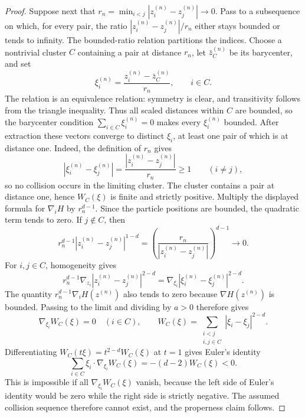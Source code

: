 \documentclass[12pt,reqno,letterpaper]{amsart}
\theoremstyle{definition}
\theoremstyle{remark}
\numberwithin{equation}{section}
\begin{document}
\begin{proof}
Suppose next that
\(r_n=\min_{i<j}|z_i^{(n)}-z_j^{(n)}|\to0\).  Pass to a subsequence on
which, for every pair, the ratio
\(|z_i^{(n)}-z_j^{(n)}|/r_n\) either stays bounded or tends to infinity.
The bounded-ratio relation partitions the indices.  Choose a nontrivial
cluster \(C\) containing a pair at distance \(r_n\), let \(\bar z_C^{(n)}\)
be its barycenter, and set
\begin{equation*}
 \xi_i^{(n)}=\frac{z_i^{(n)}-\bar z_C^{(n)}}{r_n},
 \qquad i\in C.
\end{equation*}
The relation is an equivalence relation: symmetry is clear, and transitivity
follows from the triangle inequality.  Thus all scaled distances within
\(C\) are bounded, so the barycenter condition
\(\sum_{i\in C}\xi_i^{(n)}=0\) makes every \(\xi_i^{(n)}\) bounded.  After
extraction these vectors converge to distinct \(\xi_i\), at least one pair
of which is at distance one.  Indeed, the definition of \(r_n\)
gives
\begin{equation*}
 |\xi_i^{(n)}-\xi_j^{(n)}|
 =\frac{|z_i^{(n)}-z_j^{(n)}|}{r_n}\ge1
 \qquad(i\ne j),
\end{equation*}
so no collision occurs in the limiting cluster.  The cluster contains a
pair at distance one, hence \(W_C(\xi)\) is finite and strictly positive.
Multiply the displayed formula for \(\nabla_iH\) by \(r_n^{d-1}\).  Since
the particle positions are bounded, the quadratic term tends to zero.  If
\(j\notin C\), then
\[
 r_n^{d-1}|z_i^{(n)}-z_j^{(n)}|^{1-d}
 =\left(\frac{r_n}{|z_i^{(n)}-z_j^{(n)}|}\right)^{d-1}
 \longrightarrow0.
\]
For \(i,j\in C\), homogeneity gives
\[
 r_n^{d-1}\nabla_{z_i}|z_i^{(n)}-z_j^{(n)}|^{2-d}
 =\nabla_{\xi_i}|\xi_i^{(n)}-\xi_j^{(n)}|^{2-d}.
\]
The quantity \(r_n^{d-1}\nabla_iH(z^{(n)})\) also tends to zero because
\(\nabla H(z^{(n)})\) is bounded.  Passing to the limit and dividing by
\(a>0\) therefore gives
\begin{equation*}
 \nabla_{\xi_i}W_C(\xi)=0\quad(i\in C),
 \qquad
 W_C(\xi)=\sum_{\substack{i<j\\i,j\in C}}|\xi_i-\xi_j|^{2-d}.
\end{equation*}
Differentiating \(W_C(t\xi)=t^{2-d}W_C(\xi)\) at \(t=1\) gives
Euler's identity
\begin{equation*}
 \sum_{i\in C}\xi_i\cdot\nabla_{\xi_i}W_C(\xi)
 =-(d-2)W_C(\xi)<0.
\end{equation*}
This is impossible if all \(\nabla_{\xi_i}W_C(\xi)\) vanish, because the
left side of Euler's identity would be zero while the right side is strictly
negative.  The assumed collision sequence therefore cannot exist, and the
properness claim follows.


\end{proof}
\end{document}

